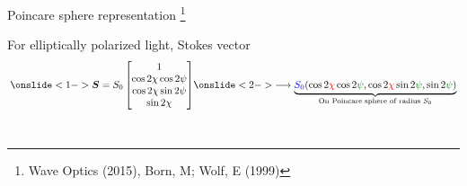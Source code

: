 \documentclass[12pt, dvipsnames]{beamer}
\numberwithin{equation}{section}
\newcommand\blfootnote[1]{%
	\begingroup
	\renewcommand\thefootnote{}\footnote{#1}%
	\addtocounter{footnote}{-1}%
	\endgroup
}
\begin{document}
\begin{frame}[t]{Poincare sphere representation}\blfootnote{Wave Optics (2015), Born, M;  Wolf, E (1999)}
	\vspace{-10pt}
	For elliptically polarized light, Stokes vector
	\begin{align*}
		\onslide<1->{\boldsymbol{S}=
		S_0
		\begin{bmatrix}
			1\\
			\cos 2\chi \cos 2\psi\\
			\cos 2\chi \sin 2\psi\\
			\sin 2\chi
		\end{bmatrix}}\onslide<2->{\longrightarrow
		\underbrace{{\color{blue}S_0}(\cos 2{\color{red}\chi} \cos 2{\color{green!45!black}\psi}, \cos 2{\color{red}\chi} \sin 2{\color{green!45!black}\psi}, \sin 2{\color{red}{\color{green!45!black}\psi}})}_{\text{On Poincare sphere of radius $S_0$}}}
	\end{align*}
\\
\vspace{7pt}
\end{frame}
\end{document}
